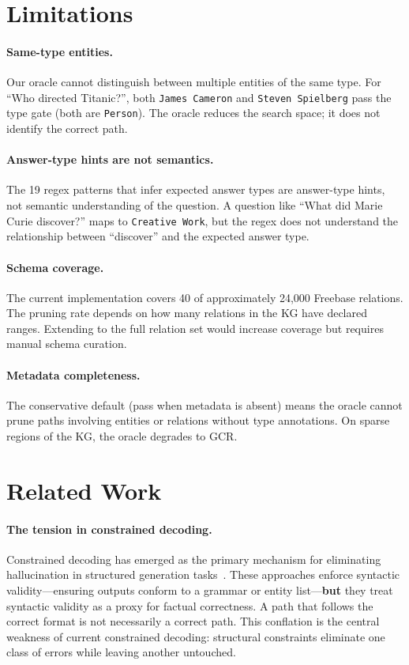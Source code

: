 \documentclass[11pt,twoside]{article}
\begin{document}
\section{Limitations}
\label{sec:limitations}

\paragraph{Same-type entities.}
Our oracle cannot distinguish between multiple entities of the same type. For ``Who directed Titanic?'', both \texttt{James Cameron} and \texttt{Steven Spielberg} pass the type gate (both are \texttt{Person}). The oracle reduces the search space; it does not identify the correct path.

\paragraph{Answer-type hints are not semantics.}
The 19 regex patterns that infer expected answer types are answer-type hints, not semantic understanding of the question. A question like ``What did Marie Curie discover?'' maps to \texttt{Creative Work}, but the regex does not understand the relationship between ``discover'' and the expected answer type.

\paragraph{Schema coverage.}
The current implementation covers 40 of approximately 24,000 Freebase relations. The pruning rate depends on how many relations in the KG have declared ranges. Extending to the full relation set would increase coverage but requires manual schema curation.

\paragraph{Metadata completeness.}
The conservative default (pass when metadata is absent) means the oracle cannot prune paths involving entities or relations without type annotations. On sparse regions of the KG, the oracle degrades to GCR.

\section{Related Work}
\label{sec:related}

\paragraph{The tension in constrained decoding.} Constrained decoding has emerged as the primary mechanism for eliminating hallucination in structured generation tasks~\citep{geng2023grammarconstrained,willard2023outlines,scholak2021picard,decao2021autoregressive}. These approaches enforce syntactic validity---ensuring outputs conform to a grammar or entity list---\textbf{but} they treat syntactic validity as a proxy for factual correctness. A path that follows the correct format is not necessarily a correct path. This conflation is the central weakness of current constrained decoding: structural constraints eliminate one class of errors while leaving another untouched.
\end{document}
